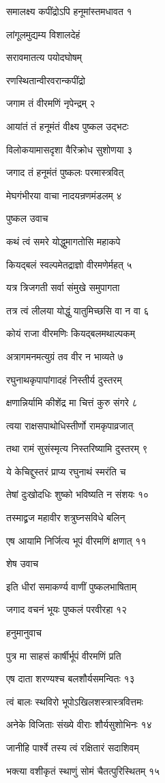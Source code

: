 समालक्ष्य कपींद्रोऽपि हनूमांस्तमधावत १

लांगूलमुद्यम्य विशालदेहं

सरावमातत्य पयोदघोषम्

रणस्थितान्वीरवरान्कपींद्रो

जगाम तं वीरमणिं नृपेन्द्रम् २

आयांतं तं हनूमंतं वीक्ष्य पुष्कल उद्भटः

विलोकयामासदृशा वैरिक्रोध सुशोणया ३

जगाद तं हनूमंतं पुष्कलः परमास्त्रवित्

मेघगंभीरया वाचा नादयन्रणमंडलम् ४

पुष्कल उवाच

कथं त्वं समरे योद्धुमागतोसि महाकपे

कियद्बलं स्वल्पमेतद्राज्ञो वीरमणेर्महत् ५

यत्र त्रिजगती सर्वा संमुखे समुपागता

तत्र त्वं लीलया योद्धुं यातुमिच्छसि वा न वा ६

कोयं राजा वीरमणिः कियद्बलमथाल्पकम्

अत्रागमनमत्युग्रं तव वीर न भाव्यते ७

रघुनाथकृपापांगादहं निस्तीर्य दुस्तरम्

क्षणान्निर्यामि कीशेंद्र मा चित्तं कुरु संगरे ८

त्वया राक्षसपाथोधिस्तीर्णो रामकृपाव्रजात्

तथा रामं सुसंस्मृत्य निस्तरिष्यामि दुस्तरम् ९

ये केचिद्दुस्तरं प्राप्य रघुनाथं स्मरंति च

तेषां दुःखोदधिः शुष्को भविष्यति न संशयः १०

तस्माद्व्रज महावीर शत्रुघ्नसविधे बलिन्

एष आयामि निर्जित्य भूपं वीरमणिं क्षणात् ११

शेष उवाच

इति धीरां समाकर्ण्य वाणीं पुष्कलभाषिताम्

जगाद वचनं भूयः पुष्कलं परवीरहा १२

हनुमानुवाच

पुत्र मा साहसं कार्षीर्भूपं वीरमणिं प्रति

एष दाता शरण्यश्च बलशौर्यसमन्वितः १३

त्वं बालः स्थविरो भूपोऽखिलशस्त्रास्त्रवित्तमः

अनेके विजिताः संख्ये वीराः शौर्यसुशोभिनः १४

जानीहि पार्श्वे तस्य त्वं रक्षितारं सदाशिवम्

भक्त्या वशीकृतं स्थाणुं सोमं चैतत्पुरिस्थितम् १५

